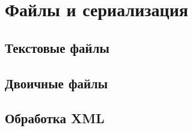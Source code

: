 \section{Файлы и сериализация}

\subsection{Текстовые файлы}

\subsection{Двоичные файлы}

\subsection{Обработка XML}
